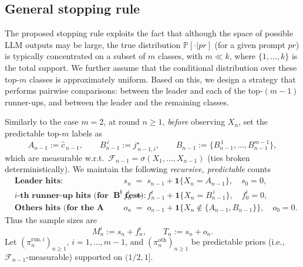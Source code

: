 \subsection{General stopping rule}\label{app:subsec_general_stopping_rule}
The proposed stopping rule exploits the fact that although the space of possible LLM outputs may be large, the true distribution $\mathbb{P}[\cdot|pr]$ (for a given prompt $pr$) is typically concentrated on a subset of $m$ classes, with $m \ll k$, where $\{1, \dots, k\}$ is the total support.
We further assume that the conditional distribution over these top-$m$ classes is approximately uniform.
Based on this, we design a strategy that performs pairwise comparisons: between the leader and each of the top-$(m-1)$ runner-ups, and between the leader and the remaining classes. 

Similarly to the case $m=2$, at round $n\!\ge\!1$, \emph{before} observing $X_n$, set the predictable top-$m$ labels as
\[
A_{n-1}:=\widehat c_{\,n-1},\qquad B_{n-1}^{\, i}:=j^\star_{\,n-1, i}, \qquad B_{n-1}:=\{B_{n-1}^{\, 1}, \dots, B_{n-1}^{m-1}\},
\]
which are measurable w.r.t.\ $\mathcal F_{n-1}=\sigma(X_1,\dots,X_{n-1})$ (ties broken deterministically).
We maintain the following \emph{recursive, predictable} counts
\[
\begin{aligned}
&\textbf{Leader hits:}&& s_n \;=\; s_{n-1} + \mathbf 1\{X_n = A_{n-1}\}, \quad s_0=0,\\
&\textbf{$i$-th runner-up hits (for the A vs $\mathbf{B^{i}}$ test):}&& f_n^i \;=\; f_{n-1}^i + \mathbf 1\{X_n = B_{n-1}^{\,i}\}, \quad f_0^i=0,\\
&\textbf{Others hits (for the A vs others test):}&& o_n \;=\; o_{n-1} + \mathbf 1\{X_n \notin \{A_{n-1},B_{n-1}\}\}, \quad o_0=0.
\end{aligned}
\]
Thus the sample sizes are
\[
M_n^i := s_n + f_n^i,\qquad
T_n := s_n + o_n.
\]
Let $(\pi^{\mathrm{run}, i}_{n})_{n\ge1}$, $i=1, \dots, m-1$, and $(\pi^{\mathrm{oth}}_{n})_{n\ge1}$ be  {predictable} priors (i.e., $\mathcal F_{n-1}$-measurable) 
supported on $(1/2,1]$.

